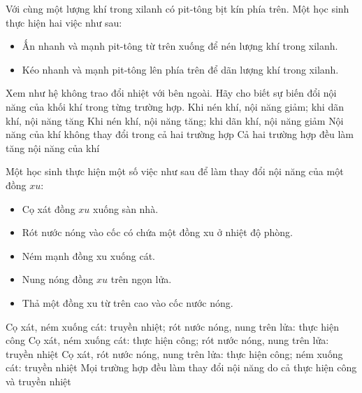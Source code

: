 \begin{ex} 
	Với cùng một lượng khí trong xilanh có pit-tông bịt kín phía trên. Một học sinh thực hiện hai việc như sau:
	\begin{itemize}
		\item[$\bullet$] Ấn nhanh và mạnh pit-tông từ trên xuống để nén lượng khí trong xilanh.
		\item[$\bullet$] Kéo nhanh và mạnh pit-tông lên phía trên để dãn lượng khí trong xilanh.
	\end{itemize}
	Xem như hệ không trao đổi nhiệt với bên ngoài. Hãy cho biết sự biến đổi nội năng của khối khí trong từng trường hợp.
	\choice
	{Khi nén khí, nội năng giảm; khi dãn khí, nội năng tăng}
	{\True Khi nén khí, nội năng tăng; khi dãn khí, nội năng giảm}
	{Nội năng của khí không thay đổi trong cả hai trường hợp}
	{Cả hai trường hợp đều làm tăng nội năng của khí}
\end{ex}

\begin{ex} 
	Một học sinh thực hiện một số việc như sau để làm thay đổi nội năng của một đồng $xu$:
	\begin{itemize}
		\item[$\bullet$] Cọ xát đồng $xu$ xuống sàn nhà.
		\item[$\bullet$] Rót nước nóng vào cốc có chứa một đồng xu ở nhiệt độ phòng.
		\item[$\bullet$] Ném mạnh đồng xu xuống cát.
		\item[$\bullet$] Nung nóng đồng $xu$ trên ngọn lửa.
		\item[$\bullet$] Thả một đồng xu từ trên cao vào cốc nước nóng.
	\end{itemize}
	\choice
	{Cọ xát, ném xuống cát: truyền nhiệt; rót nước nóng, nung trên lửa: thực hiện công}
	{\True Cọ xát, ném xuống cát: thực hiện công; rót nước nóng, nung trên lửa: truyền nhiệt}
	{Cọ xát, rót nước nóng, nung trên lửa: thực hiện công; ném xuống cát: truyền nhiệt}
	{Mọi trường hợp đều làm thay đổi nội năng do cả thực hiện công và truyền nhiệt}
\end{ex}


